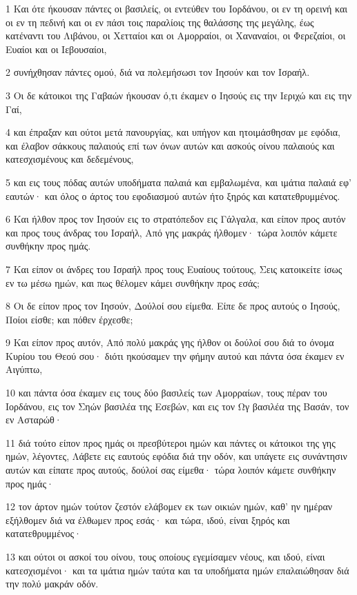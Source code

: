 \par 1 Και ότε ήκουσαν πάντες οι βασιλείς, οι εντεύθεν του Ιορδάνου, οι εν τη ορεινή και οι εν τη πεδινή και οι εν πάσι τοις παραλίοις της θαλάσσης της μεγάλης, έως κατέναντι του Λιβάνου, οι Χετταίοι και οι Αμορραίοι, οι Χαναναίοι, οι Φερεζαίοι, οι Ευαίοι και οι Ιεβουσαίοι,
\par 2 συνήχθησαν πάντες ομού, διά να πολεμήσωσι τον Ιησούν και τον Ισραήλ.
\par 3 Οι δε κάτοικοι της Γαβαών ήκουσαν ό,τι έκαμεν ο Ιησούς εις την Ιεριχώ και εις την Γαί,
\par 4 και έπραξαν και ούτοι μετά πανουργίας, και υπήγον και ητοιμάσθησαν με εφόδια, και έλαβον σάκκους παλαιούς επί των όνων αυτών και ασκούς οίνου παλαιούς και κατεσχισμένους και δεδεμένους,
\par 5 και εις τους πόδας αυτών υποδήματα παλαιά και εμβαλωμένα, και ιμάτια παλαιά εφ' εαυτών· και όλος ο άρτος του εφοδιασμού αυτών ήτο ξηρός και κατατεθρυμμένος.
\par 6 Και ήλθον προς τον Ιησούν εις το στρατόπεδον εις Γάλγαλα, και είπον προς αυτόν και προς τους άνδρας του Ισραήλ, Από γης μακράς ήλθομεν· τώρα λοιπόν κάμετε συνθήκην προς ημάς.
\par 7 Και είπον οι άνδρες του Ισραήλ προς τους Ευαίους τούτους, Σεις κατοικείτε ίσως εν τω μέσω ημών, και πως θέλομεν κάμει συνθήκην προς εσάς;
\par 8 Οι δε είπον προς τον Ιησούν, Δούλοί σου είμεθα. Είπε δε προς αυτούς ο Ιησούς, Ποίοι είσθε; και πόθεν έρχεσθε;
\par 9 Και είπον προς αυτόν, Από πολύ μακράς γης ήλθον οι δούλοί σου διά το όνομα Κυρίου του Θεού σου· διότι ηκούσαμεν την φήμην αυτού και πάντα όσα έκαμεν εν Αιγύπτω,
\par 10 και πάντα όσα έκαμεν εις τους δύο βασιλείς των Αμορραίων, τους πέραν του Ιορδάνου, εις τον Σηών βασιλέα της Εσεβών, και εις τον Ωγ βασιλέα της Βασάν, τον εν Ασταρώθ·
\par 11 διά τούτο είπον προς ημάς οι πρεσβύτεροι ημών και πάντες οι κάτοικοι της γης ημών, λέγοντες, Λάβετε εις εαυτούς εφόδια διά την οδόν, και υπάγετε εις συνάντησιν αυτών και είπατε προς αυτούς, δούλοί σας είμεθα· τώρα λοιπόν κάμετε συνθήκην προς ημάς·
\par 12 τον άρτον ημών τούτον ζεστόν ελάβομεν εκ των οικιών ημών, καθ' ην ημέραν εξήλθομεν διά να έλθωμεν προς εσάς· και τώρα, ιδού, είναι ξηρός και κατατεθρυμμένος·
\par 13 και ούτοι οι ασκοί του οίνου, τους οποίους εγεμίσαμεν νέους, και ιδού, είναι κατεσχισμένοι· και τα ιμάτια ημών ταύτα και τα υποδήματα ημών επαλαιώθησαν διά την πολύ μακράν οδόν.
